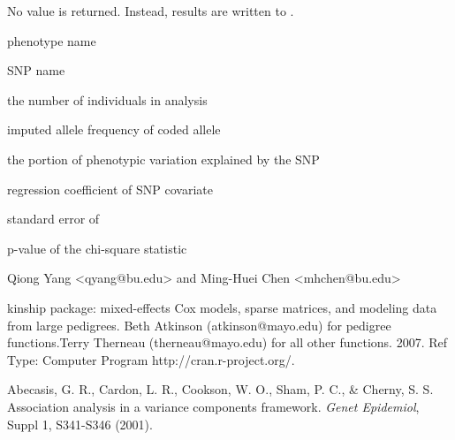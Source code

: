 \begin{Value}
No value is returned. Instead, results are written to .

\begin{ldescription}
\item[\code{phen }] phenotype name
\item[\code{snp }] SNP name
\item[\code{N }] the number of individuals in analysis
\item[\code{AF }] imputed allele frequency of coded allele
\item[\code{h2q }] the portion of phenotypic variation explained by the SNP
\item[\code{beta }] regression coefficient of SNP covariate
\item[\code{se }] standard error of 
\item[\code{pval }] p-value of the chi-square statistic
\end{ldescription}
\end{Value}
\begin{Author}\relax
Qiong Yang <qyang@bu.edu> and Ming-Huei Chen <mhchen@bu.edu>
\end{Author}
\begin{References}\relax
kinship package: mixed-effects Cox models, sparse matrices, and modeling data from large pedigrees.
Beth Atkinson (atkinson@mayo.edu) for pedigree functions.Terry Therneau (therneau@mayo.edu) for all other functions.
2007. Ref Type: Computer Program http://cran.r-project.org/. 

Abecasis, G. R., Cardon, L. R., Cookson, W. O., Sham, P. C., \& Cherny, S. S. Association analysis in 
a variance components framework. \emph{Genet Epidemiol},  Suppl 1, S341-S346 (2001).
\end{References}

